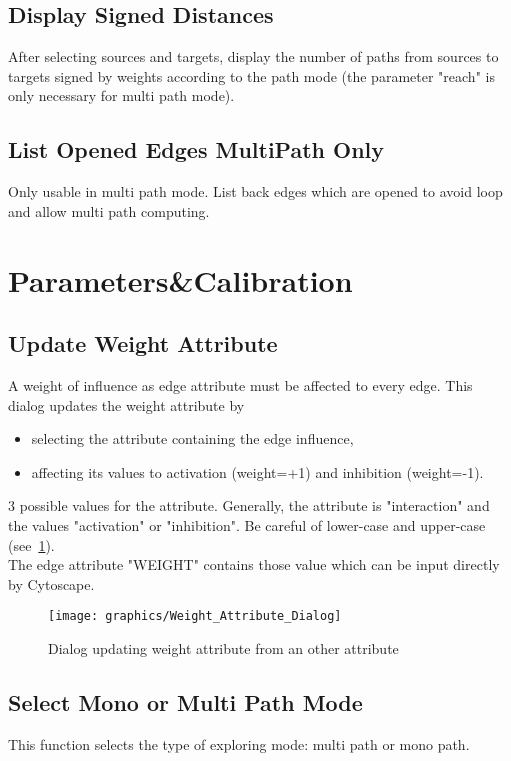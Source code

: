 \documentclass[11pt]{article}
\begin{document}
\subsection{Display Signed Distances}
After selecting sources and targets, display the number of paths from sources to targets signed by weights according to the path mode (the parameter "reach" is only necessary for multi path mode).

\subsection{List Opened Edges MultiPath Only}
Only usable in multi path mode. List back edges which are opened to avoid loop and allow multi path computing.


\section{Parameters\&Calibration}

\subsection{Update Weight Attribute}
A weight of influence as edge attribute must be affected to every edge. This dialog updates the weight attribute by 
\begin{itemize}
\item selecting the attribute containing the edge influence,
\item affecting its values to activation (weight=+1) and inhibition (weight=-1).
\end{itemize}
3 possible values for the attribute. Generally, the attribute is "interaction" and the values "activation" or "inhibition". Be careful of lower-case and upper-case (see~\ref{Weight_Attribute_Dialog}).\\
The edge attribute "WEIGHT" contains those value which can be input directly by Cytoscape.

\begin{figure}
\centering
\texttt{[image: graphics/Weight\_Attribute\_Dialog]}
\caption{Dialog updating weight attribute from an other attribute}
\label{Weight_Attribute_Dialog}
\end{figure}

\subsection{Select Mono or Multi Path Mode}
This function selects the type of exploring mode: multi path or mono path.
\end{document}
